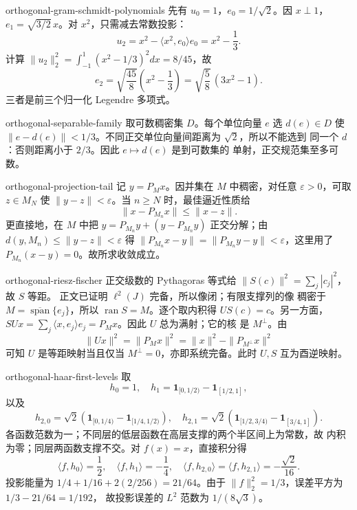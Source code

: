 \begin{solution}{orthogonal-gram-schmidt-polynomials}
先有 \(u_0=1\)，\(e_0=1/\sqrt2\)。因 \(x\perp1\)，
\(e_1=\sqrt{3/2}\,x\)。对 \(x^2\)，只需减去常数投影：
\[
 u_2=x^2-\langle x^2,e_0\rangle e_0=x^2-\frac13.
\]
计算
\(\|u_2\|_2^2=\int_{-1}^1(x^2-1/3)^2dx=8/45\)，故
\[
 e_2=\sqrt{\frac{45}{8}}\left(x^2-\frac13\right)
 =\sqrt{\frac58}\,(3x^2-1).
\]
三者是前三个归一化 Legendre 多项式。
\end{solution}

\begin{solution}{orthogonal-separable-family}
取可数稠密集 \(D\)。每个单位向量 \(e\) 选 \(d(e)\in D\) 使
\(\|e-d(e)\|<1/3\)。不同正交单位向量间距离为 \(\sqrt2\)，所以不能选到
同一个 \(d\)：否则距离小于 \(2/3\)。因此 \(e\mapsto d(e)\) 是到可数集的
单射，正交规范集至多可数。
\end{solution}

\begin{solution}{orthogonal-projection-tail}
记 \(y=P_Mx\)。因并集在 \(M\) 中稠密，对任意 \(\varepsilon>0\)，可取
\(z\in M_N\) 使 \(\|y-z\|<\varepsilon\)。当 \(n\ge N\) 时，最佳逼近性质给
\[
 \|x-P_{M_n}x\|\le\|x-z\|.
\]
更直接地，在 \(M\) 中把 \(y=P_{M_n}y+(y-P_{M_n}y)\) 正交分解；由
\(d(y,M_n)\le\|y-z\|<\varepsilon\) 得
\(\|P_{M_n}x-y\|=\|P_{M_n}y-y\|<\varepsilon\)，这里用了
\(P_{M_n}(x-y)=0\)。故所求收敛成立。
\end{solution}

\begin{solution}{orthogonal-riesz-fischer}
正交级数的 Pythagoras 等式给
\(\|S(c)\|^2=\sum_j|c_j|^2\)，故 \(S\) 等距。
正文已证明 \(\ell^2(J)\) 完备，所以像闭；有限支撑列的像
稠密于 \(M=\overline{\operatorname{span}}\{e_j\}\)，所以
\(\operatorname{ran}S=M\)。逐个取内积得 \(US(c)=c\)。另一方面，
\(SUx=\sum_j\langle x,e_j\rangle e_j=P_Mx\)。因此 \(U\) 总为满射；它的核
是 \(M^\perp\)。由
\[
 \|Ux\|^2=\|P_Mx\|^2=\|x\|^2-\|P_{M^\perp}x\|^2
\]
可知 \(U\) 是等距映射当且仅当 \(M^\perp=0\)，亦即系统完备。此时
\(U,S\) 互为酉逆映射。
\end{solution}

\begin{solution}{orthogonal-haar-first-levels}
取
\[
 h_0=1,\quad h_1=\mathbf1_{[0,1/2)}-\mathbf1_{[1/2,1]},
\]
以及
\[
 h_{2,0}=\sqrt2(\mathbf1_{[0,1/4)}-\mathbf1_{[1/4,1/2)}),\quad
 h_{2,1}=\sqrt2(\mathbf1_{[1/2,3/4)}-\mathbf1_{[3/4,1]}).
\]
各函数范数为一；不同层的低层函数在高层支撑的两个半区间上为常数，故
内积为零；同层两函数支撑不交。对 \(f(x)=x\)，直接积分得
\[
 \langle f,h_0\rangle=\frac12,\quad
 \langle f,h_1\rangle=-\frac14,\quad
 \langle f,h_{2,0}\rangle=\langle f,h_{2,1}\rangle=-\frac{\sqrt2}{16}.
\]
投影能量为 \(1/4+1/16+2(2/256)=21/64\)。由于
\(\|f\|_2^2=1/3\)，误差平方为 \(1/3-21/64=1/192\)，
故投影误差的 \(L^2\) 范数为 \(1/(8\sqrt3)\)。
\end{solution}
